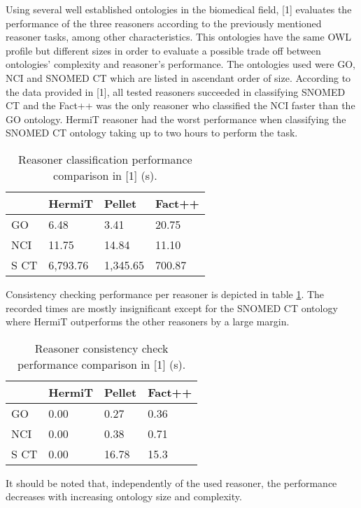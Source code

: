 Using several well established ontologies in the biomedical field, [1] evaluates the performance of the three reasoners according to the previously mentioned reasoner tasks, among other characteristics. This ontologies have the same OWL profile but different sizes in order to evaluate a possible trade off between ontologies' complexity and reasoner's performance. The ontologies used were GO, NCI and SNOMED CT which are listed in ascendant order of size. According to the data provided in [1], all tested reasoners succeeded in classifying SNOMED CT and the Fact++ was the only reasoner who classified the NCI faster than the GO ontology. HermiT reasoner had the worst performance when classifying the SNOMED CT ontology taking up to two hours to perform the task.

\begin{table}[]
\centering
\begin{tabular}{|l|l|l|l|}
\hline
      &  HermiT    &  Pellet     &  Fact++    \\ \hline
GO    &    6.48    &  3.41       &  20.75     \\ \hline
NCI   &   11.75    &  14.84      &  11.10     \\ \hline
S CT  &  6,793.76  &  1,345.65   &  700.87    \\ \hline
\end{tabular}
\caption{Reasoner classification performance comparison in [1] (s).}
\label{tab:1}
\end{table}

Consistency checking performance per reasoner is depicted in table \ref{tab:1}. The recorded times are mostly insignificant except for the SNOMED CT ontology where HermiT outperforms the other reasoners by a large margin.

\begin{table}[]
\centering
\begin{tabular}{|l|l|l|l|}
\hline
      &  HermiT  &  Pellet   &  Fact++ \\ \hline
GO    &    0.00  &  0.27     &  0.36   \\ \hline
NCI   &    0.00  &  0.38     &  0.71   \\ \hline
S CT  &    0.00  &  16.78    &  15.3   \\ \hline
\end{tabular}
\caption{Reasoner consistency check performance comparison in [1] (s).}
\label{tab:2}
\end{table}

It should be noted that, independently of the used reasoner, the performance decreases with increasing ontology size and complexity.

